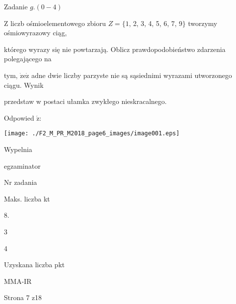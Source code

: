 \documentclass[a4paper,12pt]{article}
\begin{document}
Zadanie $g. (0-4)$

$\mathrm{Z}$ liczb ośmioelementowego zbioru $Z=\{1$, 2, 3, 4, 5, 6, 7, 9$\}$ tworzymy ośmiowyrazowy ciąg,

którego wyrazy się nie powtarzają. Oblicz prawdopodobieństwo zdarzenia polegającego na

tym, $\dot{\mathrm{z}}\mathrm{e}\dot{\mathrm{z}}$ adne dwie liczby parzyste nie są sąsiednimi wyrazami utworzonego ciągu. Wynik

przedstaw w postaci ułamka zwykłego nieskracalnego.

Odpowied $\acute{\mathrm{z}}$:
\begin{center}
\texttt{[image: ./F2\_M\_PR\_M2018\_page6\_images/image001.eps]}
\end{center}
Wypelnia

egzaminator

Nr zadania

Maks. liczba kt

8.

3

4

Uzyskana liczba pkt

MMA-IR

Strona 7 z18
\end{document}
